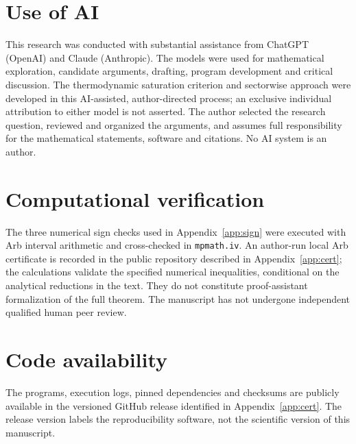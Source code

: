 \documentclass[10pt,a4paper]{article}
\numberwithin{equation}{section}
\theoremstyle{remark}\newtheorem{remark}[theorem]{Remark}\newtheorem{question}[theorem]{Question}
\begin{document}
\section*{Use of AI}
This research was conducted with substantial assistance from
ChatGPT (OpenAI) and Claude (Anthropic). The models were used for
mathematical exploration, candidate arguments, drafting, program
development and critical discussion. The thermodynamic saturation
criterion and sectorwise approach were developed in this
AI-assisted, author-directed process; an exclusive individual
attribution to either model is not asserted. The author selected
the research question, reviewed and organized the arguments, and
assumes full responsibility for the mathematical statements,
software and citations. No AI system is an author.

\section*{Computational verification}
The three numerical sign checks used in Appendix~\ref{app:sign}
were executed with Arb interval arithmetic and cross-checked in
\texttt{mpmath.iv}. An author-run local Arb certificate is recorded
in the public repository described in Appendix~\ref{app:cert};
the calculations validate the specified numerical inequalities,
conditional on the analytical reductions in the text. They do not
constitute proof-assistant formalization of the full theorem.
The manuscript has not undergone independent qualified human peer review.

\section*{Code availability}
The programs, execution logs, pinned dependencies and checksums
are publicly available in the versioned GitHub release identified
in Appendix~\ref{app:cert}. The release version labels the
reproducibility software, not the scientific version of this manuscript.

\appendix
\end{document}
